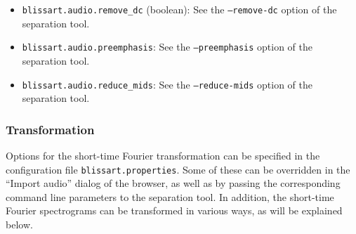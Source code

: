\begin{itemize}
  \item {\tt blissart.audio.remove\_dc} (boolean): See the {\tt --remove-dc}
    option of the separation tool.
  \item {\tt blissart.audio.preemphasis}: See the {\tt --preemphasis} option of
    the separation tool.
  \item {\tt blissart.audio.reduce\_mids}: See the {\tt --reduce-mids} option of
    the separation tool.
\end{itemize}


\subsubsection{Transformation}
\label{section:ConfigFileFFT}

Options for the short-time Fourier transformation can be specified in the
configuration file {\tt blissart.properties}. Some of these can be overridden in the
``Import audio'' dialog of the browser, as well as by passing the corresponding
command line parameters to the separation tool. In addition, the short-time
Fourier spectrograms can be transformed in various ways, as will be explained
below.

